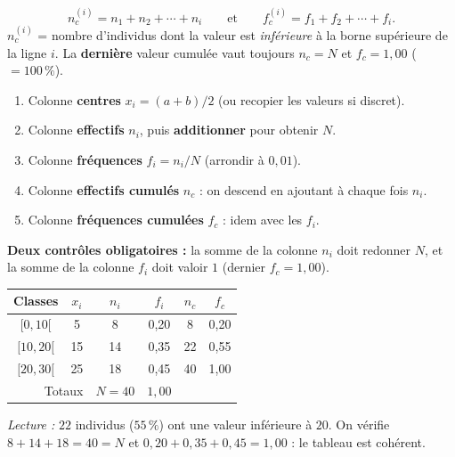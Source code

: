 \documentclass[11pt,a4paper]{article}
\begin{document}
\begin{definition}
\[
n_c^{(i)} = n_1+n_2+\cdots+n_i \qquad\text{et}\qquad f_c^{(i)}=f_1+f_2+\cdots+f_i .
\]
$n_c^{(i)}$ = nombre d'individus dont la valeur est \emph{inférieure} à la borne supérieure de la
ligne $i$. La \textbf{dernière} valeur cumulée vaut toujours $n_c=N$ et $f_c=1{,}00$ ($=100\,\%$).
\end{definition}

\begin{methode}
\begin{enumerate}
  \item Colonne \textbf{centres} $x_i=(a+b)/2$ (ou recopier les valeurs si discret).
  \item Colonne \textbf{effectifs} $n_i$, puis \textbf{additionner} pour obtenir $N$.
  \item Colonne \textbf{fréquences} $f_i=n_i/N$ (arrondir à $0{,}01$).
  \item Colonne \textbf{effectifs cumulés} $n_c$ : on descend en ajoutant à chaque fois $n_i$.
  \item Colonne \textbf{fréquences cumulées} $f_c$ : idem avec les $f_i$.
\end{enumerate}
\textbf{Deux contrôles obligatoires :} la somme de la colonne $n_i$ doit redonner $N$, et la somme
de la colonne $f_i$ doit valoir $1$ (dernier $f_c=1{,}00$).
\end{methode}

\begin{exemple}
\renewcommand{\arraystretch}{1.2}
\begin{center}
\begin{tabular}{|c|c|c|c|c|c|}
\hline
\rowcolor{primary!18}
Classes & $x_i$ & $n_i$ & $f_i$ & $n_c$ & $f_c$ \\\hline
$[0,10[$   & 5  & 8  & 0{,}20 & 8  & 0{,}20 \\
$[10,20[$  & 15 & 14 & 0{,}35 & 22 & 0{,}55 \\
$[20,30[$  & 25 & 18 & 0{,}45 & 40 & 1{,}00 \\\hline
\multicolumn{2}{|r|}{Totaux} & $N=40$ & $1{,}00$ & & \\\hline
\end{tabular}
\end{center}
\emph{Lecture :} $22$ individus ($55\,\%$) ont une valeur inférieure à $20$. On vérifie
$8+14+18=40=N$ et $0{,}20+0{,}35+0{,}45=1{,}00$ : le tableau est cohérent.
\end{exemple}
\end{document}
